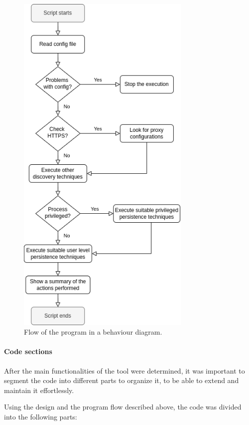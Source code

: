 \begin{figure}[!htb]
	\centering
	\includegraphics[height=17cm]{img/scriptFlowchart}
	\caption{Flow of the program in a behaviour diagram.}
	\label{img:programFlow}
\end{figure}

\pagebreak
\paragraph{Code sections} 
After the main functionalities of the tool were determined, it was important to segment the code into different parts to organize it, to be able to extend and maintain it effortlessly. 

Using the design and the program flow described above, the code was divided into the following parts:

